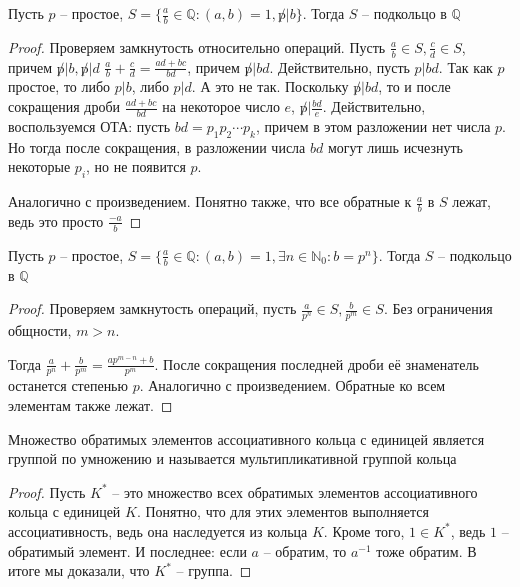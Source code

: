\documentclass{article}
\begin{document}
\begin{statement}
    Пусть $p$ -- простое, $S = \{\frac{a}{b} \in \mathbb{Q}: (a, b) = 1, \not p | b\}$. Тогда $S$ -- подкольцо в
    $\mathbb{Q}$
\end{statement}

\begin{proof}
    Проверяем замкнутость относительно операций. Пусть $\frac{a}{b} \in S, \frac{c}{d} \in S$, причем $\not p | b, \not
    p | d$
    $\frac{a}{b} + \frac{c}{d} = \frac{ad + bc}{bd}$, причем $\not p | bd$. Действительно, пусть $p | bd$. Так как $p$
    простое, то либо $p | b$, либо $p | d$. А это не так. Поскольку $\not p | bd$, то и после сокращения дроби
    $\frac{ad + bc}{bd}$ на некоторое число $e$, $\not p | \frac{bd}{e}$. Действительно, воспользуемся ОТА: пусть $bd =
    p_1 p_2 \cdots p_k$, причем в этом разложении нет числа $p$. Но тогда после сокращения, в разложении числа $bd$
    могут лишь исчезнуть некоторые $p_i$, но не появится $p$.

    Аналогично с произведением. Понятно также, что все обратные к $\frac{a}{b}$ в $S$ лежат, ведь это просто
    $\frac{-a}{b}$
\end{proof}

\begin{statement}
    Пусть $p$ -- простое, $S = \{\frac{a}{b} \in \mathbb{Q}: (a, b) = 1, \exists n \in \mathbb{N}_0: b = p^n\}$. Тогда
    $S$ -- подкольцо в $\mathbb{Q}$
\end{statement}

\begin{proof}
    Проверяем замкнутость операций, пусть $\frac{a}{p^n} \in S, \frac{b}{p^m} \in S$. Без ограничения общности, $m > n$.

    Тогда $\frac{a}{p^n} + \frac{b}{p^m} = \frac{ap^{m - n} + b}{p^m}$. После сокращения последней дроби её знаменатель
    останется степенью $p$. Аналогично с произведением. Обратные ко всем элементам также лежат.
\end{proof}

\begin{statement}
    Множество обратимых элементов ассоциативного кольца с единицей является группой по умножению и называется
    мультипликативной группой кольца
\end{statement}

\begin{proof}
    Пусть $K^*$ -- это множество всех обратимых элементов ассоциативного кольца с единицей $K$. Понятно, что для этих
    элементов выполняется ассоциативность, ведь она наследуется из кольца $K$. Кроме того, $1 \in K^*$, ведь $1$ --
    обратимый элемент. И последнее: если $a$ -- обратим, то $a^{-1}$ тоже обратим. В итоге мы доказали, что $K^*$ -- группа.
\end{proof}
\end{document}
